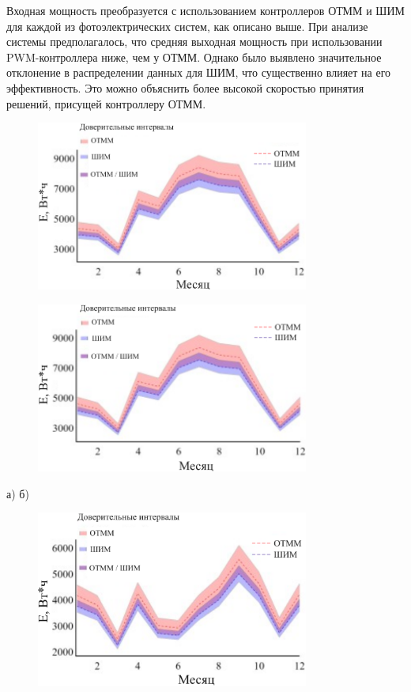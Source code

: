 \begin{multicols}{2}
Входная мощность преобразуется с использованием контроллеров ОТММ и ШИМ
для каждой из фотоэлектрических систем, как описано выше. При анализе
системы предполагалось, что средняя выходная мощность при использовании
PWM-контроллера ниже, чем у ОТММ. Однако было выявлено значительное
отклонение в распределении данных для ШИМ, что существенно влияет на его
эффективность. Это можно объяснить более высокой скоростью принятия
решений, присущей контроллеру ОТММ.
\end{multicols}


\begin{figure}[H]
	\centering
	\includegraphics[width=0.8\textwidth]{media/ict/image1}
	\caption*{}
\end{figure}

\begin{figure}[H]
	\centering
	\includegraphics[width=0.8\textwidth]{media/ict/image2}
	\caption*{}
\end{figure}


а) б)


\begin{figure}[H]
	\centering
	\includegraphics[width=0.8\textwidth]{media/ict/image3}
	\caption*{}
\end{figure}


